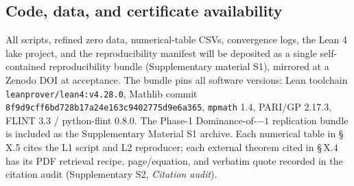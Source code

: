 \subsection{Code, data, and certificate availability}

All scripts, refined zero data, numerical-table CSVs, convergence
logs, the Lean 4 lake project, and the reproducibility manifest will
be deposited as a single self-contained reproducibility bundle
(Supplementary material S1), mirrored at a Zenodo DOI at acceptance.
The bundle pins all software versions: Lean toolchain
\texttt{leanprover/lean4:v4.28.0}, Mathlib commit
\texttt{8f9d9cff6bd728b17a24e163c9402775d9e6a365}, \texttt{mpmath} 1.4,
PARI/GP 2.17.3, FLINT 3.3 / python-flint 0.8.0. The Phase-1
Dominance-of-\(-1\) replication bundle is included as the
Supplementary Material S1 archive. Each numerical
table in \S\,X.5 cites the L1 script and L2 reproducer; each external
theorem cited in \S\,X.4 has its PDF retrieval recipe, page/equation,
and verbatim quote recorded in the citation audit
(Supplementary S2, \emph{Citation audit}).

